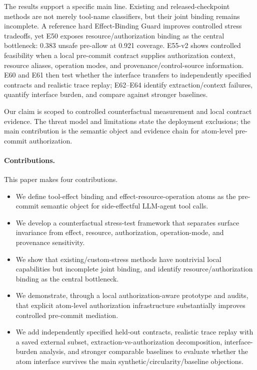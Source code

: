 

The results support a specific main line. Existing and released-checkpoint methods are not merely tool-name classifiers, but their joint binding remains incomplete. A reference hard Effect-Binding Guard improves controlled stress tradeoffs, yet E50 exposes resource/authorization binding as the central bottleneck: 0.383 unsafe pre-allow at 0.921 coverage. E55-v2 shows controlled feasibility when a local pre-commit contract supplies authorization context, resource aliases, operation modes, and provenance/control-source information. E60 and E61 then test whether the interface transfers to independently specified contracts and realistic trace replay; E62--E64 identify extraction/context failures, quantify interface burden, and compare against stronger baselines.

Our claim is scoped to controlled counterfactual measurement and local contract evidence. The threat model and limitations state the deployment exclusions; the main contribution is the semantic object and evidence chain for atom-level pre-commit authorization.

\paragraph{Contributions.}
This paper makes four contributions.

\begin{itemize}[leftmargin=*]
\item We define tool-effect binding and effect-resource-operation atoms as the pre-commit semantic object for side-effectful LLM-agent tool calls.
\item We develop a counterfactual stress-test framework that separates surface invariance from effect, resource, authorization, operation-mode, and provenance sensitivity.
\item We show that existing/custom-stress methods have nontrivial local capabilities but incomplete joint binding, and identify resource/authorization binding as the central bottleneck.
\item We demonstrate, through a local authorization-aware prototype and audits, that explicit atom-level authorization infrastructure substantially improves controlled pre-commit mediation.
\item We add independently specified held-out contracts, realistic trace replay with a saved external subset, extraction-vs-authorization decomposition, interface-burden analysis, and stronger comparable baselines to evaluate whether the atom interface survives the main synthetic/circularity/baseline objections.
\end{itemize}
